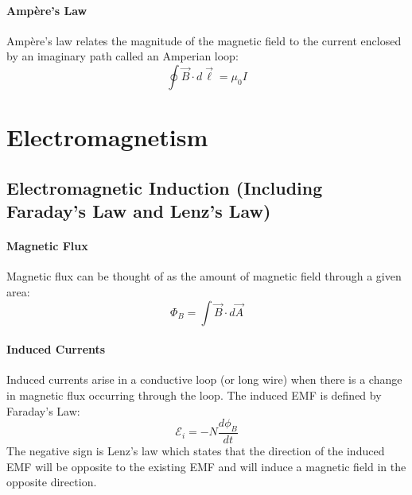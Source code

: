 \documentclass{article}
\begin{document}
            \paragraph{Amp\`{e}re's Law}
            Amp\`{e}re's law relates the magnitude of the magnetic field to the current enclosed by an imaginary path called an Amperian loop:
            \begin{equation}
                \oint \vec{B} \cdot d\vec{\ell} = \mu_0 I
            \end{equation}

    \section{Electromagnetism}

        \subsection{Electromagnetic Induction (Including Faraday’s Law and Lenz’s Law)}
            \paragraph{Magnetic Flux}
            Magnetic flux can be thought of as the amount of magnetic field through a given area:
            \begin{equation}
                \Phi_B = \int \vec{B} \cdot d\vec{A}
            \end{equation}

            \paragraph{Induced Currents}
            Induced currents arise in a conductive loop (or long wire) when there is a change in magnetic flux occurring through the loop. The induced EMF is defined by Faraday's Law:
            \begin{equation}
                \mathcal{E}_i = - N \frac{d\phi_B}{dt}
            \end{equation}
            The negative sign is Lenz's law which states that the direction of the induced EMF will be opposite to the existing EMF and will induce a magnetic field in the opposite direction.
\end{document}
